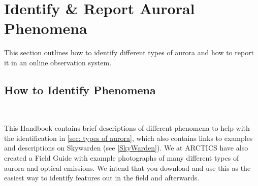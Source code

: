 \documentclass{article}
\begin{document}
\section{Identify \& Report Auroral Phenomena}
This section outlines how to identify different types of aurora and how to report it in an online observation system.

\subsection{How to Identify Phenomena} \

This Handbook contains brief descriptions of different phenomena to help with the identification in \ref{sec: types of aurora}, which also contains links to examples and descriptions on Skywarden (see \ref{SkyWarden}). We at ARCTICS have also created a Field Guide with example photographs of many different types of aurora and optical emissions. We intend that you download and use this as the easiest way to identify features out in the field and afterwards.
\end{document}

